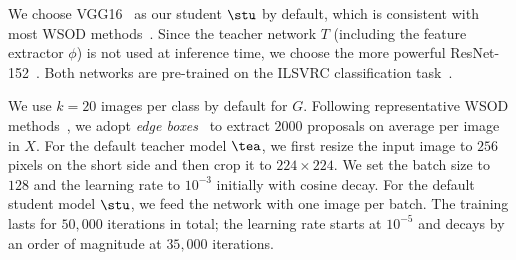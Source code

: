  We choose VGG16~\cite{vgg} as our student $\stu$ by default, which is consistent with most WSOD methods~\cite{wsddn,tang2017cvpr,tang2018eccv,shen2019cvpr,tang2018pami}.
{Since the teacher network $T$ (including the feature extractor $\phi$)} is not used at inference time, we choose the more powerful ResNet-152~\cite{resnet}.
Both networks are pre-trained on the ILSVRC classification task~\cite{RDS+14}.

 We use $k=20$ images per class by default for $G$. Following representative WSOD methods~\cite{wsddn,tang2017cvpr,tang2018pami,zhang2018cvpr}, we adopt \emph{edge boxes}~\cite{edgeboxes} to extract $2000$ proposals on average per image in $X$. For the default teacher model $\tea$, we first resize the input image to $256$ pixels on the short side and then crop it to $224 \times 224$. We set the batch size to $128$ and the learning rate to $10^{-3}$ initially with cosine decay. For the default student model $\stu$, we feed the network with one image per batch. The training lasts for $50,000$ iterations in total; the learning rate starts at $10^{-5}$ and decays by an order of magnitude at $35,000$ iterations.

